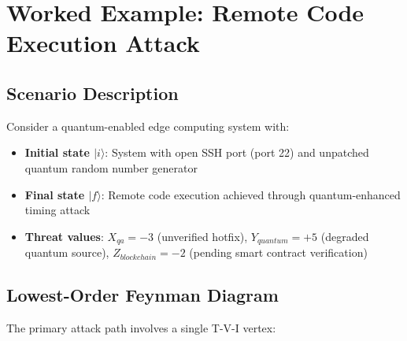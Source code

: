 \documentclass[11pt,a4paper]{article}
\begin{document}
\section{Worked Example: Remote Code Execution Attack}

\subsection{Scenario Description}

Consider a quantum-enabled edge computing system with:
\begin{itemize}
    \item \textbf{Initial state $|i\rangle$}: System with open SSH port (port 22) and unpatched quantum random number generator
    \item \textbf{Final state $|f\rangle$}: Remote code execution achieved through quantum-enhanced timing attack
    \item \textbf{Threat values}: $X_{qa} = -3$ (unverified hotfix), $Y_{quantum} = +5$ (degraded quantum source), $Z_{blockchain} = -2$ (pending smart contract verification)
\end{itemize}

\subsection{Lowest-Order Feynman Diagram}

The primary attack path involves a single T-V-I vertex:

\begin{center}
\end{center}
\end{document}

